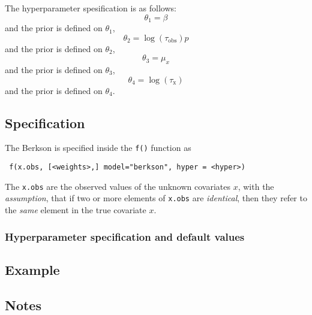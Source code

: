 \documentclass[a4paper,11pt]{article}
\begin{document}
The hyperparameter spesification is as follows:
\begin{displaymath}
    \theta_{1} = \beta
\end{displaymath}
and the prior is defined on $\theta_{1}$,
\begin{displaymath}
    \theta_{2} = \log(\tau_{\text{obs}})
p\end{displaymath}
and the prior is defined on $\theta_{2}$,
\begin{displaymath}
    \theta_{3} = \mu_{x}
\end{displaymath}
and the prior is defined on $\theta_{3}$,
\begin{displaymath}
    \theta_{4} = \log(\tau_{\text{x}})
\end{displaymath}
and the prior is defined on $\theta_{4}$.


\subsection*{Specification}

The Berkson is specified inside the {\tt f()}
function as
\begin{verbatim}
 f(x.obs, [<weights>,] model="berkson", hyper = <hyper>)
\end{verbatim}
The \texttt{x.obs} are the observed values of the unknown covariates
$x$, with the \emph{assumption}, that if two or more elements of
\texttt{x.obs} are \emph{identical}, then they refer to the
\emph{same} element in the true covariate $x$.

\subsubsection*{Hyperparameter specification and default values}


\subsection*{Example}



\subsection*{Notes}
\end{document}
